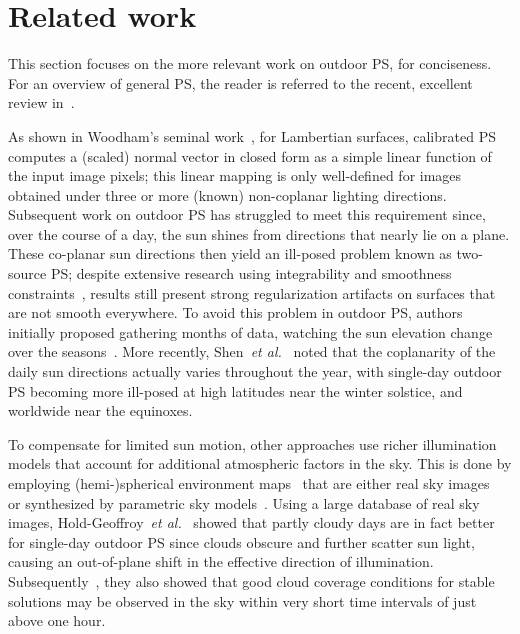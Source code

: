 \section{Related work}

This section focuses on the more relevant work on outdoor PS, for conciseness. For an overview of general PS, the reader is referred to the recent, excellent review in~\cite{shi-tpami-18}.


As shown in Woodham's seminal work~\cite{woodham-opteng-80}, for Lambertian surfaces, calibrated PS computes a (scaled) normal vector in closed form as a simple linear function of the input image pixels; this linear mapping is only well-defined for images obtained under three or more (known) non-coplanar lighting directions.
Subsequent work on outdoor PS has struggled to meet this requirement since, over the course of a day, the sun shines from directions that nearly lie on a plane. These co-planar sun directions then yield an ill-posed problem known as two-source PS; despite extensive research using integrability and smoothness constraints~\cite{onn-ijcv-90,hernandez-pami-11}, results still present strong regularization artifacts on surfaces that are not smooth everywhere. To avoid this problem in outdoor PS, authors initially proposed gathering months of data, watching the sun elevation change over the seasons~\cite{abrams-eccv-12,ackermann-cvpr-12}. More recently, Shen~{\em et al.}~\cite{shen-pg-14} noted that the coplanarity of the daily sun directions actually varies throughout the year, with single-day outdoor PS becoming more ill-posed at high latitudes near the winter solstice, and worldwide near the equinoxes.


To compensate for limited sun motion, other approaches use richer illumination models that account for additional atmospheric factors in the sky. This is done by employing (hemi-)spherical environment maps~\cite{debevec-siggraph-98} that are either real sky images~\cite{yu-iccp-13,shi-3dv-14,hung-wacv-15} or synthesized by parametric sky models~\cite{inose-tcva-13,jung-cvpr-15}. Using a large database of real sky images, Hold-Geoffroy~{\em et al.}~\cite{holdgeoffroy-iccp-15} showed that partly cloudy days are in fact better for single-day outdoor PS since clouds obscure and further scatter sun light, causing an out-of-plane shift in the effective direction of illumination. Subsequently~\cite{holdgeoffroy-3dv-15}, they also showed that good cloud coverage conditions for stable solutions may be observed in the sky within very short time intervals of just above one hour.

